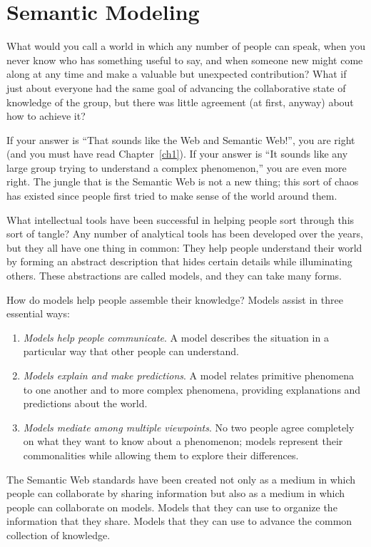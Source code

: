 \chapter{Semantic Modeling}
What would you call a world in which any number of people can speak,
when you never know who has something useful to say, and when someone
new might come along at any time and make a valuable but unexpected
contribution? What if just about everyone had the same goal of advancing
the collaborative state of knowledge of the group, but there was little
agreement (at first, anyway) about how to achieve it?

If your answer is ``That sounds like the Web and Semantic Web!'', you
are right (and you must have read Chapter~\ref{ch1}). If your answer is ``It
sounds like any large group trying to understand a complex phenomenon,''
you are even more right. The jungle that is the Semantic Web is not a
new thing; this sort of chaos has existed since people first tried to
make sense of the world around them.

What intellectual tools have been successful in helping people sort
through this sort of tangle? Any number of analytical tools has been
developed over the years, but they all have one thing in common: They
help people understand their world by forming an abstract description
that hides certain details while illuminating others. These abstractions
are called models, and they can take many forms.

How do models help people assemble their knowledge? Models assist in
three essential ways:


\begin{enumerate}
\def\labelenumi{\arabic{enumi}.}
\item
  \emph{Models help people communicate}. A model describes the situation
  in a particular way that other people can understand.
\item
  \emph{Models explain and make predictions}. A model relates primitive
  phenomena to one another and to more complex phenomena, providing
  explanations and predictions about the world.
\item
  \emph{Models mediate among multiple viewpoints}. No two people agree
  completely on what they want to know about a phenomenon; models
  represent their commonalities while allowing them to explore their
  differences.
\end{enumerate}

The Semantic Web standards have been created not only as a medium in
which people can collaborate by sharing information but also as a medium
in which people can collaborate on models. Models that they can use to
organize the information that they share. Models that they can use to
advance the common collection of knowledge.

